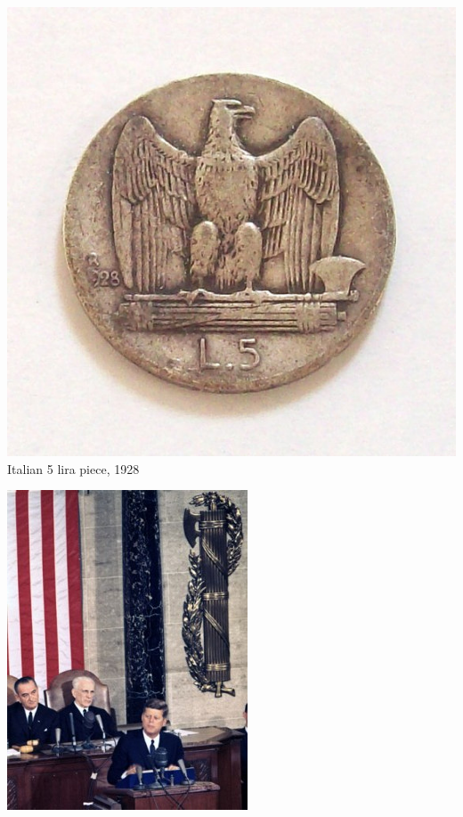 \begin{frame}
    \centering
    \includegraphics[height=.8\textheight]{img/fasces/italy-fasces-coin.jpg} \\
    Italian 5 lira piece, 1928 \\
\end{frame}
\begin{frame}
    \centering
    \includegraphics[height=.9\textheight]{img/fasces/jfk.jpg} \\
\end{frame}
